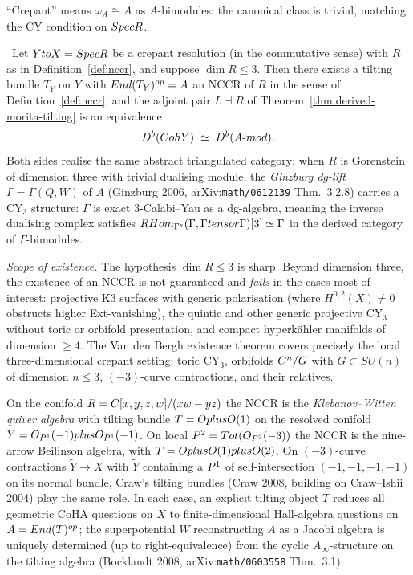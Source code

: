 ``Crepant'' means $\omega_A \cong A$ as $A$-bimodules: the canonical class is
trivial, matching the CY condition on $Spec R$.

\begin{theorem}
\label{thm:vdb-equivalence}
\ClaimStatusTheorem\ Let $Y to X = Spec R$ be a crepant resolution (in the
commutative sense) with $R$ as in Definition~\ref{def:nccr}, and suppose
$\dim R \leq 3$. Then there exists a tilting bundle $T_Y$ on $Y$ with
$End(T_Y)^{op} = A$ an NCCR of $R$ in the sense of
Definition~\ref{def:nccr}, and the adjoint pair $L \dashv R$ of
Theorem~\ref{thm:derived-morita-tilting} is an equivalence
\[
  D^{b}(Coh Y) \;\simeq\; D^{b}(A\text{-}mod).
\]
Both sides realise the same abstract triangulated category; when $R$ is
Gorenstein of dimension three with trivial dualising module, the
\emph{Ginzburg dg-lift} $\Gamma = \Gamma(Q, W)$ of $A$ (Ginzburg 2006,
arXiv:\texttt{math/0612139} Thm.~3.2.8) carries a CY$_{3}$ structure:
$\Gamma$ is exact $3$-Calabi--Yau as a dg-algebra, meaning the inverse
dualising complex satisfies
$RHom_{\Gamma^e}(\Gamma, \Gamma tensor \Gamma)[3] \simeq \Gamma$ in the
derived category of $\Gamma$-bimodules.

\emph{Scope of existence.} The hypothesis $\dim R \leq 3$ is sharp. Beyond
dimension three, the existence of an NCCR is not guaranteed and \emph{fails}
in the cases most of interest: projective K3 surfaces with generic polarisation
(where $H^{0,2}(X) \neq 0$ obstructs higher Ext-vanishing), the quintic and
other generic projective CY$_3$ without toric or orbifold presentation, and
compact hyperk\"ahler manifolds of dimension $\geq 4$. The Van den Bergh
existence theorem covers precisely the local three-dimensional crepant setting:
toric CY$_3$, orbifolds $C^n/G$ with $G \subset SU(n)$ of dimension $n \leq 3$,
$(-3)$-curve contractions, and their relatives.
\end{theorem}

On the conifold $R = C[x,y,z,w]/(xw - yz)$ the NCCR is the \emph{Klebanov--Witten
quiver algebra} with tilting bundle $T = O plus O(1)$ on the resolved
conifold $Y = O_{P^1}(-1) plus O_{P^1}(-1)$. On local $P^2 =
Tot(O_{P^2}(-3))$ the NCCR is the nine-arrow Beilinson algebra, with
$T = O plus O(1) plus O(2)$. On $(-3)$-curve contractions
$\tilde Y \to X$ with $\tilde Y$ containing a $P^1$ of self-intersection
$(-1,-1,-1,-1)$ on its normal bundle, Craw's tilting bundles (Craw
2008, building on Craw--Ishii 2004) play the same role. In each case, an
explicit tilting object $T$ reduces all geometric CoHA questions on $X$ to
finite-dimensional Hall-algebra questions on $A = End(T)^{op}$; the
superpotential $W$ reconstructing $A$ as a Jacobi algebra is uniquely
determined (up to right-equivalence) from the cyclic $A_\infty$-structure on
the tilting algebra (Bocklandt 2008, arXiv:\texttt{math/0603558} Thm.~3.1).

